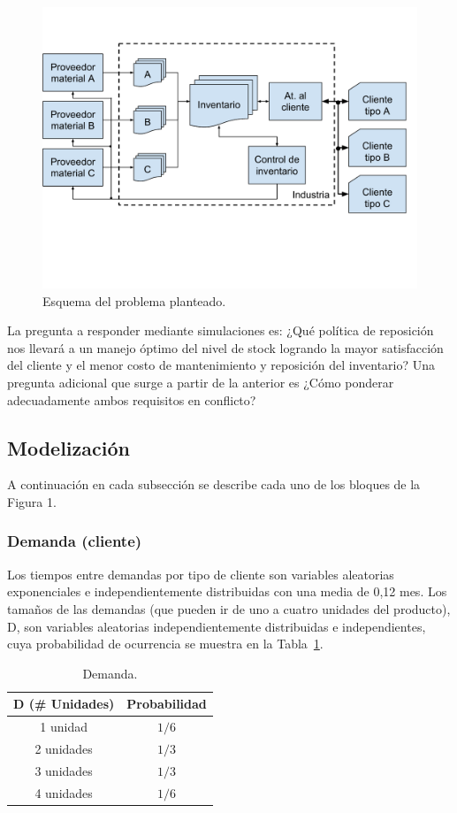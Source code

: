 \documentclass[10pt]{article}
\begin{document}
\begin{figure}
\centering
\includegraphics[scale=1]{img/figura1}
\caption{Esquema del problema planteado.}
\label{fig:fig1}
\end{figure}

La pregunta a responder mediante simulaciones es:
¿Qué política de reposición nos llevará a un manejo óptimo del nivel de stock logrando la mayor satisfacción del cliente y el menor costo de mantenimiento y reposición del inventario?
Una pregunta adicional que surge a partir de la anterior es ¿Cómo ponderar adecuadamente ambos requisitos en conflicto?

\subsection{Modelización}
A continuación en cada subsección se describe cada uno de los bloques de la Figura 1.

\subsubsection{Demanda (cliente)}
Los tiempos entre demandas por tipo de cliente son variables aleatorias exponenciales e independientemente distribuidas con una media de 0,12 mes. Los tamaños de las demandas (que pueden ir de uno a cuatro unidades del producto), D, son variables aleatorias independientemente distribuidas e independientes, cuya probabilidad de ocurrencia se muestra en la Tabla~\ref{tab:tabla1}.

\begin{table}[t]
\begin{center}
\begin{tabular}{cc}
\toprule
\textbf{D (\# Unidades)} & \textbf{Probabilidad}\\
\midrule
1 unidad & $1/6$\\
2 unidades & $1/3$\\
3 unidades & $1/3$\\
4 unidades & $1/6$\\
\bottomrule
\end{tabular}
\end{center}
\caption{Demanda.}
\label{tab:tabla1}
\end{table}
\end{document}
